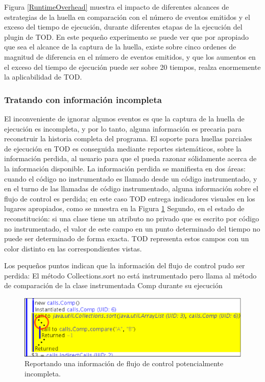 \documentclass[12pt,legalpaper]{report}
\begin{document}
Figura \ref{RuntimeOverhead} muestra el impacto de diferentes alcances de estrategias de la huella en comparación con el número de eventos emitidos y el exceso del tiempo de ejecución, durante diferentes etapas de la ejecución del plugin de TOD.  En este pequeño experimento se puede ver que por apropiado que sea el alcance de la captura de la huella, existe sobre cinco ordenes de magnitud de diferencia en el número de eventos emitidos, y que los aumentos en el exceso del tiempo de ejecución puede ser sobre 20 tiempos, realza enormemente la aplicabilidad de TOD.

			\subsubsection{Tratando con información incompleta}

El inconveniente de ignorar algunos eventos es que la captura de la huella de ejecución es incompleta, y por lo tanto, alguna información es precaria para reconstruir la historia completa del programa.  El soporte para huellas parciales de ejecución en TOD es conseguida mediante reportes sistemáticos, sobre la información perdida, al usuario para que el pueda razonar sólidamente acerca de la información disponible.  La información perdida se manifiesta en dos áreas: cuando el código no instrumentado es llamado desde un código instrumentado, y en el turno de las llamadas de código instrumentado, alguna información sobre el flujo de control es perdida; en este caso TOD entrega indicadores visuales en los lugares apropiados, como se muestra en la Figura \ref{IndirectCFlow}  Segundo, en el estado de reconstitución: si una clase tiene un atributo no privado que es escrito por código no instrumentado, el valor de este campo en un punto determinado del tiempo no puede ser determinado de forma exacta.  TOD representa estos campos con un color distinto en las correspondientes vistas.

Los pequeños puntos indican que la información del flujo de control pudo ser perdida: El método Collections.sort no está instrumentado pero llama al método de comparación de la clase instrumentada Comp durante su ejecución


\begin{figure}[h]
	\centering
	\includegraphics[scale=0.4]{images/TOD/IndirectCFlow.eps}
	\caption{Reportando una información de flujo de control potencialmente incompleta.}
	\label{IndirectCFlow}
\end{figure}
\end{document}
